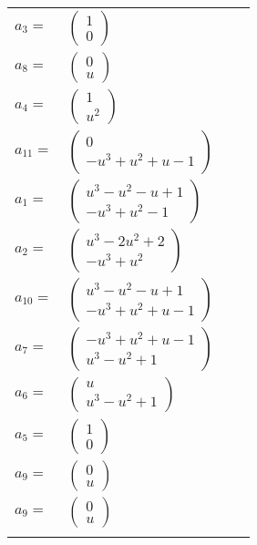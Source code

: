 \documentclass[1p]{elsarticle_modified}
\theoremstyle{definition}
\begin{document}
\begin{tabular}{m{7pt} m{180pt} m{7pt} m{180pt} }
\flushright $a_{3}=$&$\begin{pmatrix}1\\0\end{pmatrix}$ \\
\flushright $a_{8}=$&$\begin{pmatrix}0\\u\end{pmatrix}$ \\
\flushright $a_{4}=$&$\begin{pmatrix}1\\u^2\end{pmatrix}$ \\
\flushright $a_{11}=$&$\begin{pmatrix}0\\- u^3+u^2+u-1\end{pmatrix}$ \\
\flushright $a_{1}=$&$\begin{pmatrix}u^3- u^2- u+1\\- u^3+u^2-1\end{pmatrix}$ \\
\flushright $a_{2}=$&$\begin{pmatrix}u^3-2 u^2+2\\- u^3+u^2\end{pmatrix}$ \\
\flushright $a_{10}=$&$\begin{pmatrix}u^3- u^2- u+1\\- u^3+u^2+u-1\end{pmatrix}$ \\
\flushright $a_{7}=$&$\begin{pmatrix}- u^3+u^2+u-1\\u^3- u^2+1\end{pmatrix}$ \\
\flushright $a_{6}=$&$\begin{pmatrix}u\\u^3- u^2+1\end{pmatrix}$ \\
\flushright $a_{5}=$&$\begin{pmatrix}1\\0\end{pmatrix}$ \\
\flushright $a_{9}=$&$\begin{pmatrix}0\\u\end{pmatrix}$\\ \flushright $a_{9}=$&$\begin{pmatrix}0\\u\end{pmatrix}$\\&\end{tabular}
\end{document}
